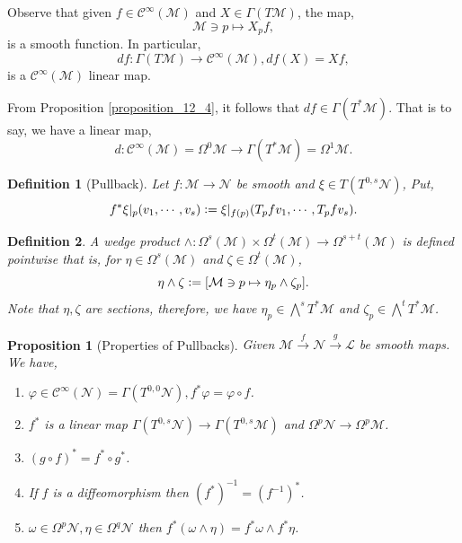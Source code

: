 \documentclass[10pt]{article}
\newtheorem{proposition}{Proposition}[section]
\newtheorem{definition}{Definition}[section]
\newcommand{\defeq}{\vcentcolon=}
\newcommand{\M}[0]{\mathcal{M}}
\newcommand{\maniN}[0]{\mathcal{N}}
\newcommand{\cinf}[0]{\mathcal{C}^\infty}
\begin{document}
Observe that given $f\in\cinf(\M)$ and $X\in\Gamma(T\M)$, the map,
\begin{equation*}
  \M\ni p\mapsto X_pf,
\end{equation*}
is a smooth function. In particular,
\begin{equation*}
  df:\Gamma(T\M)\to\cinf(\M), df(X)=Xf,
\end{equation*}
is a $\cinf(\M)$ linear map. 
\par From Proposition \ref{proposition_12_4}, it follows that $df\in\Gamma(T^*\M)$. That is to say, we have a linear map,
\begin{equation*}
  d:\cinf(\M)=\Omega^0\M\to\Gamma(T^*\M)=\Omega^1\M.
\end{equation*}
\begin{definition}[Pullback]
  \label{defnition_12_5}
  Let $f:\M\to\maniN$ be smooth and $\xi\in T(T^{0,s}\maniN)$, Put,
  \begin{equation*}
    f^*\xi|_p(v_1,\cdots,v_s) \defeq \xi|_{f(p)}(T_pfv_1,\cdots,T_pfv_s).
  \end{equation*}
\end{definition}

\begin{definition}
  A wedge product $\wedge:\Omega^s(\M)\times\Omega^t(\M)\to\Omega^{s+t}(\M)$ is defined pointwise that is,
  for $\eta\in\Omega^s(\M)$ and $\zeta\in\Omega^t(\M)$, 
  \begin{equation*}
    \eta\wedge \zeta\defeq [\M\ni p\mapsto \eta_p\wedge\zeta_p].
  \end{equation*}
  Note that $\eta,\zeta$ are sections, therefore, we have $\eta_p\in\bigwedge^sT^*\M$ and $\zeta_p\in\bigwedge^tT^*\M$.
\end{definition}
\begin{proposition}[Properties of Pullbacks]
  \label{proposition_12_6}
  Given $\M\stackrel{f}{\to}\maniN\stackrel{g}{\to}\mathcal{L}$ be smooth maps. We have,
  \begin{enumerate}
    \item $\varphi\in\cinf(\maniN)=\Gamma(T^{0,0}\maniN), f^*\varphi=\varphi\circ f$.
    \item $f^*$ is a linear map $\Gamma(T^{0,s}\maniN)\to\Gamma(T^{0,s}\M)$ and $\Omega^p\maniN\to\Omega^p\M$. 
    \item $(g\circ f)^* = f^*\circ g^*$.
    \item If $f$ is a diffeomorphism then $(f^*)^{-1} = (f^{-1})^*$.
    \item $\omega\in\Omega^p\maniN,\eta\in\Omega^q\maniN$ then $f^*(\omega\wedge\eta) = f^*\omega\wedge f^*\eta$.
  \end{enumerate}
\end{proposition}
\end{document}

